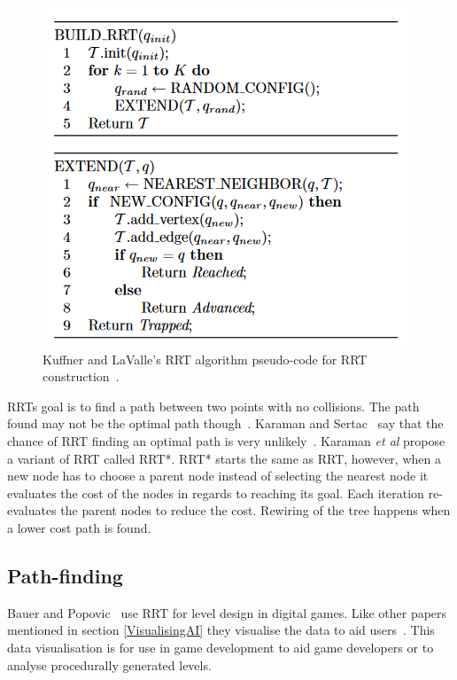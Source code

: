 \documentclass[journal]{IEEEtran}
\begin{document}
\begin{figure}[h]
	\includegraphics[width=1.0\linewidth]{RRTPseudocode.png}
	\caption{ Kuffner and LaValle's RRT algorithm pseudo-code for RRT construction~\cite{Kuffner2000}.}
	\label{RRTPseudocode}
\end{figure} 

RRTs goal is to find a path between two points with no collisions. The path found may not be the optimal path though~\cite{Kuffner2000,Karaman2011}. Karaman and Sertac~\cite{karaman2010} say that the chance of RRT finding an optimal path is very unlikely~\cite{karaman2010,Tremblay2014}.  Karaman \textit{et al} propose a variant of RRT called RRT*. RRT* starts the same as RRT, however, when a new node has to choose a parent node instead of selecting the nearest node it evaluates the cost of the nodes in regards to reaching its goal. Each iteration re-evaluates the parent nodes to reduce the cost. Rewiring of the tree happens when a lower cost path is found.

\subsection{Path-finding} \label{Pathfinding}
Bauer and Popovic~\cite{bauer2012} use RRT for level design in digital games. Like other papers mentioned in section \ref{VisualisingAI} they visualise the data to aid users~\cite{bauer2012,Haworth2010}. This data visualisation is for use in game development to aid game developers or to analyse procedurally generated levels. 
\end{document}

